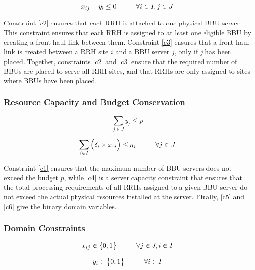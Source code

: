 \documentclass[conference]{IEEEtran}
\begin{document}
\begin{equation}
x_{ij} - y_i \leq 0  \hspace{10 mm}\forall i \in I, j \in J
\label{c3}
\end{equation}

Constraint \eqref{c2} ensures that each \ac{RRH} is attached to one physical BBU server. This constraint ensures that each \ac{RRH} is assigned to at least one eligible \ac{BBU} by creating a front haul link between them. Constraint \eqref{c3} ensures that a front haul link is created between a RRH site $i$ and a \ac{BBU} server $j$, only if $j$ has been placed. Together, constraints \eqref{c2} and \eqref{c3} ensure that the required number of \acp{BBU} are placed to serve all RRH sites, and that \acp{RRH} are only assigned to sites where \acp{BBU} have been placed. 

\subsubsection{Resource Capacity and Budget Conservation}

\begin{equation}
\sum \limits_{j \in J} y_{j} \leq p
\label{c1}
\end{equation}

\begin{equation}
\sum \limits_{i \in I}  \Big(\delta_i \times x_{ij} \Big) \leq \eta_j \hspace{10 mm}\forall j \in J
\label{c4}
\end{equation}

Constraint \eqref{c1} ensures that the maximum number of \ac{BBU} servers does not exceed the budget $p$, while \eqref{c4} is a server capacity constraint that ensures that the total processing requirements of all \acp{RRH} assigned to a given \ac{BBU} server do not exceed the actual physical resources installed at the server. Finally, \eqref{c5} and \eqref{c6} give the binary domain variables.

\subsubsection{Domain Constraints}

\begin{equation}
x_{ij} \in \big\{ 0 , 1 \big\} \hspace{10 mm}\forall j \in J, i \in I
\label{c5}
\end{equation}

\begin{equation}
y_i \in \big\{ 0 , 1 \big\} \hspace{10 mm}\forall i \in I
\label{c6}
\end{equation}
\end{document}
